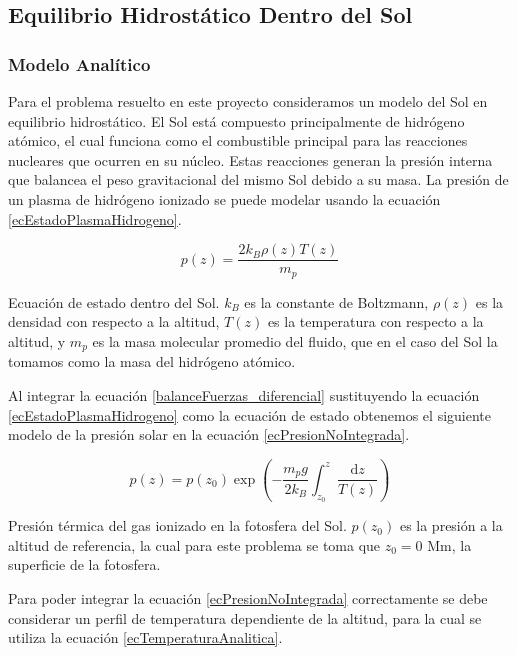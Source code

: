\subsection*{Equilibrio Hidrostático Dentro del Sol}

\subsubsection*{Modelo Analítico}

Para el problema resuelto en este proyecto consideramos un modelo del Sol en
equilibrio hidrostático. El Sol está compuesto principalmente de hidrógeno
atómico, el cual funciona como el combustible principal para las reacciones
nucleares que ocurren en su núcleo. Estas reacciones generan la presión interna
que balancea el peso gravitacional del mismo Sol debido a su masa. La presión de
un plasma de hidrógeno ionizado se puede modelar usando la ecuación
\ref{ecEstadoPlasmaHidrogeno}. 

\begin{equ}[!ht]
	\begin{equation} \label{ecEstadoPlasmaHidrogeno}
		p(z) = \frac{2 k_B \rho (z) T(z)}{m_p}
	\end{equation}
	\caption{Ecuación de estado dentro del Sol. \(k_B\) es la constante de
	Boltzmann, \(\rho (z)\) es la densidad con respecto a la altitud, \(T(z)\)
	es la temperatura con respecto a la altitud, y \(m_p\) es la masa molecular
	promedio del fluido, que en el caso del Sol la tomamos como la masa del
	hidrógeno atómico. \cite{newtonianCafe}}
\end{equ}

Al integrar la ecuación \ref{balanceFuerzas_diferencial} sustituyendo la
ecuación \ref{ecEstadoPlasmaHidrogeno} como la ecuación de estado obtenemos el
siguiente modelo de la presión solar en la ecuación \ref{ecPresionNoIntegrada}.

\begin{equ}[!ht]
	\begin{equation} \label{ecPresionNoIntegrada}
		p(z) = p(z_0) \exp \left(- \frac{m_p g}{2 k_B} \int_{z_0}^{z} \frac{\mathrm{d} z}{T(z)}\right)
	\end{equation}
	\caption{Presión térmica del gas ionizado en la fotosfera del Sol.
	\(p(z_0)\) es la presión a la altitud de referencia, la cual para este
	problema se toma que \(z_0 = 0 \textrm{ Mm}\), la superficie de la
	fotosfera.}
\end{equ}

Para poder integrar la ecuación \ref{ecPresionNoIntegrada} correctamente se debe
considerar un perfil de temperatura dependiente de la altitud, para la cual se
utiliza la ecuación \ref{ecTemperaturaAnalitica}.

